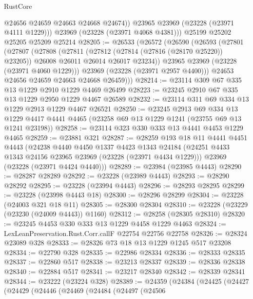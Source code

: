 \begin{lexlean}{RustCore}
\begin{coremodule}
            @24656
            @24659
            @24663
            @24668
            @24674))
        @23965
        @23969
        (@23228 (@23971 @4111 @1229)))
      @23969
      (@23228 (@23971 @4068 @4381)))
    @25199
    @25202
    @25205
    @25209
    @25214
@28205 := @26533
    (@26572
      (@26590
        (@26593
          (@27801
            (@27807
              (@27808
                (@27811
                  (@27812 (@27814 (@27816 (@28170 @25220)) @23205))
                  @26008
                  @26011
                  @26014
                  @26017
                  @23234))
              @23965
              @23969
              (@23228 (@23971 @4060 @1229)))
            @23969
            (@23228 (@23971 @2957 @4400)))
          @24653
          @24656
          @24659
          @24663
          @24668
          @26459)))
@28214 := @23114 @309 @67 @335 @13 @1229 @2910 @1229 @4469 @26499
@28223 := @23245 @2910 @67 @335 @13 @1229 @2950 @1229 @4467 @26589
@28232 := @23114 @311 @69 @334 @13 @1229 @2913 @1229 @4467 @26521
@28250 := @23245
    @2913
    @69
    @334
    @13
    @1229
    @4417
    @4441
    @4465
    (@23258 @69 @13 @1229 @1241 (@23755 @69 @13 @1241 @23198))
@28258 := @23114 @323 @330 @333 @13 @4441 @4453 @1229 @4465
@28259 := @23881 @321
@28287 := @28259
    @193
    @18
    @11
    @4441
    @4451
    @4443
    (@24238
      @4440
      @4450
      @1337
      @4423
      @1343
      @24184
      (@24251 @4433 @1343 @24156 @23965 @23969 (@23228 (@23971 @4434 @1229)))
      @23969
      (@23228 (@23971 @4424 @4440)))
@28289 := @23984 (@23985 @4443)
@28290 := @28287 @28289
@28292 := @23228 (@23989 @4443)
@28293 := @28290 @28292
@28295 := @23228 (@23994 @4443)
@28296 := @28293 @28295
@28299 := @23228 (@23998 @4443 @18)
@28300 := @28296 @28299
@28304 := @23228 (@24003 @321 @18 @11)
@28305 := @28300 @28304
@28310 := @23228 (@23229 (@23230 (@24009 @4443)) @1160)
@28312 := @28258 (@28305 @28310)
@28320 := @23245 @4453 @330 @333 @13 @1229 @4458 @1229 @4463
@28324 := LexLeanPreservation.Rust.Corr.callF @22754 @22756 @22758
@28326 := @28324 @23089 @328
@28333 := @28326 @73 @18 @13 @1229 @1245 @517 @23208
@28334 := @22790 @328
@28335 := @22986 @28334
@28336 := @28333 @28335
@28337 := @22860 @517
@28338 := @23213 @28337
@28339 := @28336 @28338
@28340 := @22884 @517
@28341 := @23217 @28340
@28342 := @28339 @28341
@28344 := @23222 (@23224 @328)
@28389 := @24359
    (@24384
      (@24425
        (@24427
          (@24429
            (@24446
              (@24469
                (@24484
                  (@24497
                    (@24506

\end{coremodule}
\end{lexlean}
